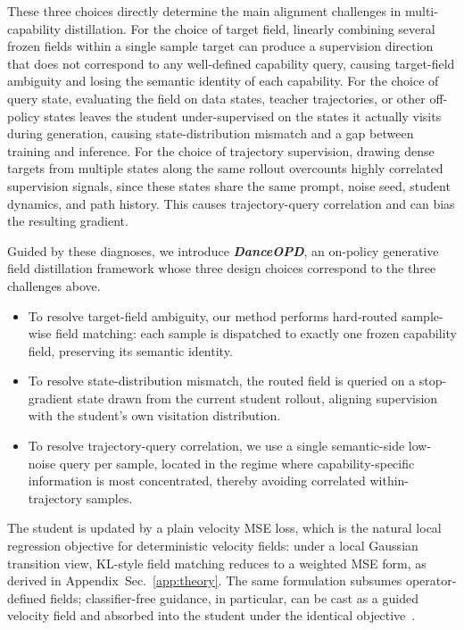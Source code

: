 \documentclass{llmxive}
\providecommand{\name}{\textsl{\textbf{DanceOPD}}\xspace}
\begin{document}
These three choices directly determine the main alignment challenges in multi-capability distillation. For the choice of target field, linearly combining several frozen fields within a single sample target can produce a supervision direction that does not correspond to any well-defined capability query, causing target-field ambiguity and losing the semantic identity of each capability. For the choice of query state, evaluating the field on data states, teacher trajectories, or other off-policy states leaves the student under-supervised on the states it actually visits during generation, causing state-distribution mismatch and a gap between training and inference. For the choice of trajectory supervision, drawing dense targets from multiple states along the same rollout overcounts highly correlated supervision signals, since these states share the same prompt, noise seed, student dynamics, and path history. This causes trajectory-query correlation and can bias the resulting gradient.


Guided by these diagnoses, we introduce \name{}, an on-policy generative field distillation framework whose three design choices correspond to the three challenges above.
\begin{itemize}
    \item To resolve target-field ambiguity, our method performs hard-routed sample-wise field matching: each sample is dispatched to exactly one frozen capability field, preserving its semantic identity.

    \item To resolve state-distribution mismatch, the routed field is queried on a stop-gradient state drawn from the current student rollout, aligning supervision with the student's own visitation distribution.

    \item To resolve trajectory-query correlation, we use a single semantic-side low-noise query per sample, located in the regime where capability-specific information is most concentrated, thereby avoiding correlated within-trajectory samples.
\end{itemize}


The student is updated by a plain velocity MSE loss, which is the natural local regression objective for deterministic velocity fields: under a local Gaussian transition view, KL-style field matching reduces to a weighted MSE form, as derived in Appendix~Sec.~\ref{app:theory}. The same formulation subsumes operator-defined fields; classifier-free guidance, in particular, can be cast as a guided velocity field and absorbed into the student under the identical objective~\cite{ho2022classifier}.
\end{document}
